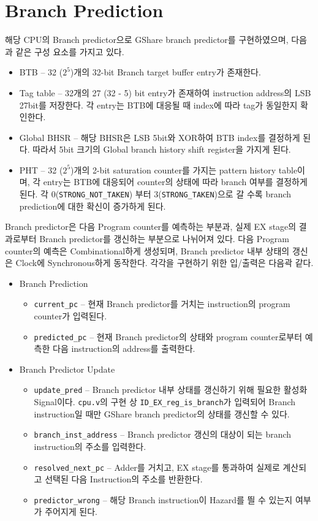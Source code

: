 \documentclass{scrartcl}
\begin{document}
\section{Branch Prediction}
해당 CPU의 Branch predictor으로 GShare branch predictor를 구현하였으며, 다음과 같은 구성 요소를 가지고 있다.
\begin{itemize}
  \item BTB -- 32 ($2^5$)개의 32-bit Branch target buffer entry가 존재한다.
  \item Tag table -- 32개의 27 (32 - 5) bit entry가 존재하여 instruction address의 LSB 27bit를 저장한다. 각 entry는 BTB에 대응될 때 index에 따라 tag가 동일한지 확인한다.
  \item Global BHSR -- 해당 BHSR은 LSB 5bit와 XOR하여 BTB index를 결정하게 된다. 따라서 5bit 크기의 Global branch history shift register을 가지게 된다.
  \item PHT -- 32 ($2^5$)개의 2-bit saturation counter를 가지는 pattern history table이며, 각 entry는 BTB에 대응되어 counter의 상태에 따라 branch 여부를 결정하게 된다. 각 0(\texttt{STRONG\_NOT\_TAKEN}) 부터 3(\texttt{STRONG\_TAKEN})으로 갈 수록 branch prediction에 대한 확신이 증가하게 된다.
\end{itemize}

Branch predictor은 다음 Program counter를 예측하는 부분과, 실제 EX stage의 결과로부터 Branch predictor를 갱신하는 부분으로 나뉘어져 있다.
다음 Program counter의 예측은 Combinational하게 생성되며, Branch predictor 내부 상태의 갱신은 Clock에 Synchronous하게 동작한다. 각각을 구현하기 위한 입/출력은 다음곽 같다.
\begin{itemize}
  \item Branch Prediction
  \begin{itemize}
    \item \texttt{current\_pc} -- 현재 Branch predictor를 거치는 instruction의 program counter가 입력된다.
    \item \texttt{predicted\_pc} -- 현재 Branch predictor의 상태와 program counter로부터 예측한 다음 instruction의 address를 출력한다.
  \end{itemize}
  \item Branch Predictor Update
  \begin{itemize}
    \item \texttt{update\_pred} -- Branch predictor 내부 상태를 갱신하기 위해 필요한 활성화 Signal이다. \texttt{cpu.v}의 구현 상 \texttt{ID\_EX\_reg\_is\_branch}가 입력되어 Branch instruction일 때만 GShare branch predictor의 상태를 갱신할 수 있다.
    \item \texttt{branch\_inst\_address} -- Branch predictor 갱신의 대상이 되는 branch instruction의 주소를 입력한다.
    \item \texttt{resolved\_next\_pc} -- Adder를 거치고, EX stage를 통과하여 실제로 계산되고 선택된 다음 Instruction의 주소를 반환한다.
    \item \texttt{predictor\_wrong} -- 해당 Branch instruction이 Hazard를 띌 수 있는지 여부가 주어지게 된다.
  \end{itemize}
\end{itemize} 
\end{document}
